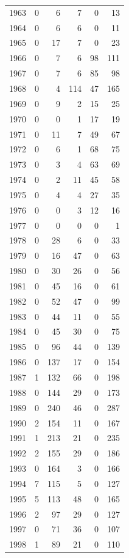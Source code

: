 \documentclass[
]{scrartcl}
\begin{document}
\begin{longtable}{rrrrrr}
1963 & 0 & 6 & 7 & 0 & 13 \\ 
1964 & 0 & 6 & 6 & 0 & 11 \\ 
1965 & 0 & 17 & 7 & 0 & 23 \\ 
1966 & 0 & 7 & 6 & 98 & 111 \\ 
1967 & 0 & 7 & 6 & 85 & 98 \\ 
1968 & 0 & 4 & 114 & 47 & 165 \\ 
1969 & 0 & 9 & 2 & 15 & 25 \\ 
1970 & 0 & 0 & 1 & 17 & 19 \\ 
1971 & 0 & 11 & 7 & 49 & 67 \\ 
1972 & 0 & 6 & 1 & 68 & 75 \\ 
1973 & 0 & 3 & 4 & 63 & 69 \\ 
1974 & 0 & 2 & 11 & 45 & 58 \\ 
1975 & 0 & 4 & 4 & 27 & 35 \\ 
1976 & 0 & 0 & 3 & 12 & 16 \\ 
1977 & 0 & 0 & 0 & 0 & 1 \\ 
1978 & 0 & 28 & 6 & 0 & 33 \\ 
1979 & 0 & 16 & 47 & 0 & 63 \\ 
1980 & 0 & 30 & 26 & 0 & 56 \\ 
1981 & 0 & 45 & 16 & 0 & 61 \\ 
1982 & 0 & 52 & 47 & 0 & 99 \\ 
1983 & 0 & 44 & 11 & 0 & 55 \\ 
1984 & 0 & 45 & 30 & 0 & 75 \\ 
1985 & 0 & 96 & 44 & 0 & 139 \\ 
1986 & 0 & 137 & 17 & 0 & 154 \\ 
1987 & 1 & 132 & 66 & 0 & 198 \\ 
1988 & 0 & 144 & 29 & 0 & 173 \\ 
1989 & 0 & 240 & 46 & 0 & 287 \\ 
1990 & 2 & 154 & 11 & 0 & 167 \\ 
1991 & 1 & 213 & 21 & 0 & 235 \\ 
1992 & 2 & 155 & 29 & 0 & 186 \\ 
1993 & 0 & 164 & 3 & 0 & 166 \\ 
1994 & 7 & 115 & 5 & 0 & 127 \\ 
1995 & 5 & 113 & 48 & 0 & 165 \\ 
1996 & 2 & 97 & 29 & 0 & 127 \\ 
1997 & 0 & 71 & 36 & 0 & 107 \\ 
1998 & 1 & 89 & 21 & 0 & 110 \\ 

\end{longtable}
\end{document}
